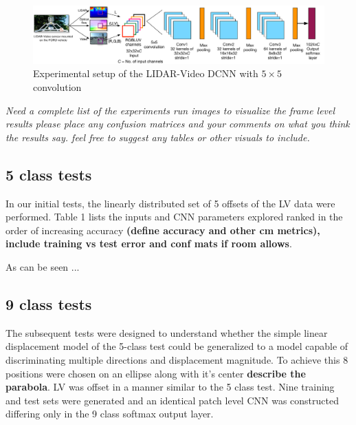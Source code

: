 \documentclass{article}
\begin{document}
\begin{figure}[htbp]
    \centering
        \includegraphics[scale=0.35]{Figures/lidar_dcnn_setup1.pdf}
    \caption{Experimental setup of the LIDAR-Video DCNN with $5\times5$ convolution}
    \label{fig:Figures_lidar_dcnn_setup1}
\end{figure}

\textit{Need a complete list of the experiments run
images to visualize the frame level results
please place any confusion matrices and your comments on what you think the results say.
feel free to suggest any tables or other visuals to include.}




\subsection{5 class tests} %
\label{sub:5_class_tests}
In our initial tests, the linearly distributed set of 5 offsets of the LV data were performed. Table 1 lists the inputs and CNN parameters explored ranked in the order of increasing accuracy \textbf{(define accuracy and other cm metrics), include training vs test error and conf mats if room allows}.  

As can be seen ... 


\subsection{9 class tests} %
\label{sub:9_class_tests}
The subsequent tests were designed to understand whether the simple linear displacement model of the 5-class test could be generalized to a model capable of discriminating multiple directions and displacement magnitude. To achieve this 8 positions were chosen on an ellipse along with it's center \textbf{describe the parabola}. LV was offset in a manner similar to the 5 class test. Nine training and test sets were generated and an identical patch level CNN was constructed differing only in the 9 class softmax output layer. 
\end{document}
